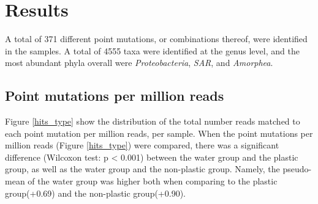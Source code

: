 \chapter{Results}

A total of 371 different point mutations, or combinations thereof, were identified in the samples. 
A total of 4555 taxa were identified at the genus level, and the most abundant phyla overall were \emph{Proteobacteria}, \emph{SAR}, and \emph{Amorphea}. 



\section{Point mutations per million reads}
Figure \ref{hits_type} show the distribution of the total number reads matched to each point mutation per million reads, per sample. 
When the point mutations per million reads (Figure \ref{hits_type}) were compared, there was a significant difference (Wilcoxon test: p < 0.001) between the water group and the plastic group, as well as the water group and the non-plastic group. Namely, the pseudo-mean of the water group was higher both when comparing to the plastic group(+0.69) and the non-plastic group(+0.90).

